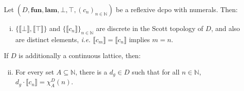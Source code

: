 \documentclass{lmcs}
\newcommand{\sembrack}[1]{\llbracket{#1}\rrbracket}
\newcommand{\N}{\ensuremath{\mathbb{N}}}
\newcommand{\fun}{\mathbf{fun}}
\newcommand{\lam}{\mathbf{lam}}
\begin{document}
\begin{lem}
	\label{EncodingUsefulLemma}
	Let $(D,\fun,\lam,\bot,\top,(c_n)_{n \in \N})$ be a reflexive dcpo with numerals. Then:
	\begin{enumerate}[(i)]
		\item $\{ \sembrack{\bot}, \sembrack{\top} \}$ and $\{ \sembrack{c_n} \}_{n \in \N}$ are discrete in the Scott topology of $D$, and also are distinct elements, \emph{i.e.} $\sembrack{c_m} = \sembrack{c_n}$ implies $m = n$. 
	\end{enumerate}
	If $D$ is additionally a continuous lattice, then:
	\begin{enumerate}[(i)]
		\setcounter{enumi}{1}
		\item For every set $A \subseteq \N$, there is a $d_g \in D$ such that for all $n \in \N$, $d_g \cdot \sembrack{c_n} = \chi^D_A(n)$. 
	\end{enumerate}
\end{lem}
\end{document}
